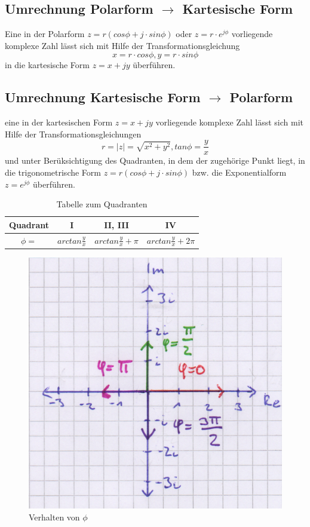 \subsection{Umrechnung Polarform $\rightarrow$ Kartesische Form}
Eine in der Polarform $z = r (cos\phi + j \cdot sin\phi)$ oder $z=r \cdot e^{j\phi}$ vorliegende komplexe Zahl lässt sich mit Hilfe der Transformationsgleichung 
$$ x = r \cdot cos\phi, y = r \cdot sin\phi$$ 
in die kartesische Form $z = x + jy$ überführen.

\subsection{Umrechnung Kartesische Form $\rightarrow$ Polarform}
eine in der kartesischen Form $z = x + jy$ vorliegende komplexe Zahl lässt sich mit Hilfe der Transformationsgleichungen 
$$ r = |z| = \sqrt{x^2 + y^2}, tan \phi = \frac{y}{x}$$ 
und unter Berüksichtigung des Quadranten, in dem der zugehörige Punkt liegt, in die trigonometrische Form $z = r(cos\phi + j \cdot sin\phi)$ bzw. die Exponentialform $z=e^{j\phi}$ überführen.
\begin{table}[H]
\begin{tabular}{|c|c|c|c|}
\hline 
Quadrant & I & II, III & IV \\ 
\hline 
$\phi =$ & $arctan \frac{y}{x}$ & $arctan \frac{y}{x}+\pi$ & $arctan \frac{y}{x} + 2\pi$ \\ 
\hline 
\end{tabular}
\caption{Tabelle zum Quadranten}
\end{table} 

\begin{figure}[H]
\centering 
	\includegraphics[width=1\textwidth]{Bilder/phi}
\caption{Verhalten von $\phi$}
\end{figure} 

